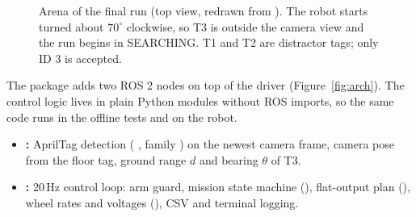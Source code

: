 \begin{figure}[H]
\caption{Arena of the final run  (top view, redrawn from ).
The robot starts turned about $70^\circ$ clockwise, so T3 is outside the camera view and the run begins in SEARCHING.
T1 and T2 are distractor tags; only ID 3 is accepted.}
\label{fig:arena}
\end{figure}

The package  adds two ROS 2 nodes on top of the  driver \cite{rmros}
(Figure~\ref{fig:arch}). The control logic lives in plain Python modules without ROS imports, so the same code runs
in the offline tests and on the robot.
\begin{itemize}
  \item \textbf{:} AprilTag detection \cite{olson,wang} ( \cite{pupil}, family ) on the newest
        camera frame, camera pose from the floor tag, ground range $d$ and bearing $\theta$ of T3.
  \item \textbf{:} 20\,Hz control loop: arm guard, mission state machine (),
        flat-output plan (), wheel rates and voltages (), CSV and terminal logging.
\end{itemize}

